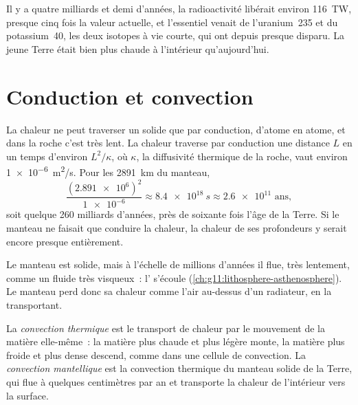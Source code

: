 Il y a quatre milliards et demi d'années, la radioactivité libérait environ
\qty{116}{TW}, presque cinq fois la valeur actuelle, et l'essentiel venait
de l'uranium~235 et du potassium~40, les deux isotopes à vie courte, qui
ont depuis presque disparu. La jeune Terre était bien plus chaude à
l'intérieur qu'aujourd'hui.

\section{Conduction et convection}

La chaleur ne peut traverser un solide que par conduction, d'atome en atome,
et dans la roche c'est très lent. La chaleur traverse par conduction une
distance $L$ en un temps d'environ $L^2/\kappa$, où $\kappa$, la
diffusivité thermique de la roche, vaut environ \qty{1e-6}{m^2/s}. Pour les
\qty{2891}{km} du manteau,
\[
  \frac{(\num{2.891e6})^2}{\num{1e-6}} \approx \qty{8.4e18}{s} \approx
  \num{2.6e11} \text{ ans},
\]
soit quelque 260 milliards d'années, près de soixante fois l'âge de la
Terre. Si le manteau ne faisait que conduire la chaleur, la chaleur de ses
profondeurs y serait encore presque entièrement.

Le manteau est solide, mais à l'échelle de millions d'années il flue, très
lentement, comme un fluide très visqueux~: l' s'écoule
(\cref{ch:g11:lithosphere-asthenosphere}). Le manteau perd donc sa chaleur
comme l'air au-dessus d'un radiateur, en la transportant.

\begin{definition}\label{def:g12:internal-heat:convection}
La \emph{convection thermique} est le transport
de chaleur par le mouvement de la matière elle-même~: la matière plus
chaude et plus légère monte, la matière plus froide et plus dense descend,
comme dans une cellule de convection. La \emph{convection
mantellique} est la convection thermique du
manteau solide de la Terre, qui flue à quelques centimètres par an et
transporte la chaleur de l'intérieur vers la surface.
\end{definition}


